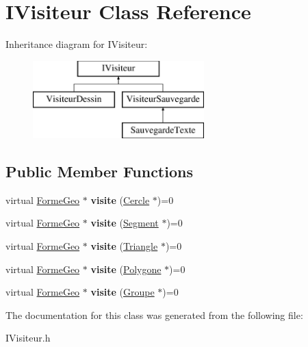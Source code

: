 \hypertarget{class_i_visiteur}{}\section{I\+Visiteur Class Reference}
\label{class_i_visiteur}
Inheritance diagram for I\+Visiteur\+:\begin{figure}[H]
\begin{center}
\leavevmode
\includegraphics[height=3.000000cm]{df/dc2/class_i_visiteur}
\end{center}
\end{figure}
\subsection*{Public Member Functions}
\begin{DoxyCompactItemize}
\item 
\mbox{\label{class_i_visiteur_abf1f842fce993972c41a71934e8302ab}} 
virtual \mbox{\hyperlink{class_forme_geo}{Forme\+Geo}} $\ast$ {\bfseries visite} (\mbox{\hyperlink{class_cercle}{Cercle}} $\ast$)=0
\item 
\mbox{\label{class_i_visiteur_ace61fe9031adc9666630901163496441}} 
virtual \mbox{\hyperlink{class_forme_geo}{Forme\+Geo}} $\ast$ {\bfseries visite} (\mbox{\hyperlink{class_segment}{Segment}} $\ast$)=0
\item 
\mbox{\label{class_i_visiteur_a72e64a4cb65562f8ece64bdce5778285}} 
virtual \mbox{\hyperlink{class_forme_geo}{Forme\+Geo}} $\ast$ {\bfseries visite} (\mbox{\hyperlink{class_triangle}{Triangle}} $\ast$)=0
\item 
\mbox{\label{class_i_visiteur_a433f47c5320082ad887014aa51262ad2}} 
virtual \mbox{\hyperlink{class_forme_geo}{Forme\+Geo}} $\ast$ {\bfseries visite} (\mbox{\hyperlink{class_polygone}{Polygone}} $\ast$)=0
\item 
\mbox{\label{class_i_visiteur_acbc0fcbc911afb6d290f2ded58112775}} 
virtual \mbox{\hyperlink{class_forme_geo}{Forme\+Geo}} $\ast$ {\bfseries visite} (\mbox{\hyperlink{class_groupe}{Groupe}} $\ast$)=0
\end{DoxyCompactItemize}


The documentation for this class was generated from the following file\+:\begin{DoxyCompactItemize}
\item 
I\+Visiteur.\+h\end{DoxyCompactItemize}
